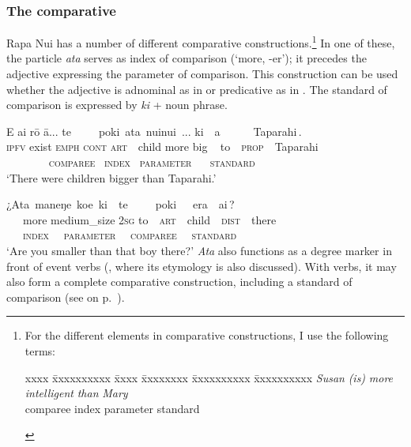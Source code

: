 \subsubsection[The comparative]{The comparative}\label{sec:3.5.2.1}
Rapa Nui has a number of different comparative constructions.\footnote{\label{fn:137}For the different elements in comparative constructions, I use the following terms:
\begin{tabbing}
xxxx \= xxxxxxxxxx \= xxxx \= xxxxxxxx \= xxxxxxxxxx \= xxxxxxxxxx  \kill
\> \textit{Susan} \> \textit{(is)} \> \textit{more} \> \textit{intelligent} \> \textit{than} \textit{Mary}\\
  \> comparee  \>  \> index  \> parameter  \> standard
\end{tabbing}
  } In one of these, the particle \textit{{\ꞌ}ata} serves as index of comparison (‘more, -er’); it precedes the adjective expressing the parameter of comparison. This construction can be used whether the adjective is adnominal as in  or predicative as in . The standard of comparison is expressed by \textit{ki} + noun phrase.

\ea\label{ex:3.112}
\glll E ai rō {\ꞌ}ā... {\ob}te~~~~~poki\,{\cb} {\ob}{\ꞌ}ata\,{\cb} {\ob}nuinui\,{\cb} ... {\ob}ki~~a~~~~~~Taparahi\,{\cb}. \\
\textsc{ipfv} exist \textsc{emph} \textsc{cont} {\db}\textsc{art}~~child {\db}more {\db}big ~ {\db}to~~\textsc{prop}~~Taparahi \\
~ ~ ~ ~    \textsc{~comparee} \textsc{~index} \textsc{~parameter} ~ \textsc{~standard} \\

\glt 
‘There were children bigger than Taparahi.’ \textstyleExampleref{[R250.011]} 
\z

\ea\label{ex:3.113}
\glll ¿{\ob}{\ꞌ}Ata\,{\cb} {\ob}maneŋe\,{\cb} {\ob}koe\,{\cb} {\ob}ki~~te~~~~~poki~~~era~~ai\,{\cb}? \\
~~~more {\db}medium\_size {\db}\textsc{2sg} {\db}to~~\textsc{art}~~child~~\textsc{dist}~~there \\
~~\textsc{~index} \textsc{~~parameter} \textsc{~~comparee} \textsc{~~standard}\\

\glt
‘Are you smaller than that boy there?’ \textstyleExampleref{[}\textstyleExampleref{R415.176]}
\z
\textit{{\ꞌ}Ata} also functions as a degree marker in front of event verbs (, where its etymology is also discussed). With verbs, it may also form a complete comparative construction, including a standard of comparison (see  on p.~\pageref{ex:7.94}).

